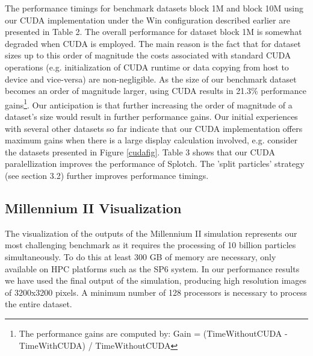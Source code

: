 The performance timings for benchmark datasets block 1M and block 10M using our CUDA 
implementation under the Win configuration described earlier are presented in Table 2. 
The overall performance for dataset block 1M is somewhat degraded when CUDA is employed. 
The main reason is the fact that for dataset sizes up to this order of magnitude the 
costs associated with standard CUDA operations (e.g. initialization of CUDA runtime 
or data copying from host to device and vice-versa) are non-negligible. 
As the size of our benchmark dataset becomes an order of magnitude larger, 
using CUDA results in 21.3\% performance gains\footnote{The performance gains 
are computed by: Gain = (TimeWithoutCUDA - TimeWithCUDA) / TimeWithoutCUDA}. 
Our anticipation is that further increasing the order of magnitude of a dataset's 
size would result in further performance gains. Our initial experiences with several 
other datasets so far indicate that our CUDA implementation offers maximum gains 
when there is a large display calculation involved, e.g. consider the datasets 
presented in Figure \ref{cudafig}. Table 3 shows that our CUDA paralellization improves the 
performance of Splotch. The 'split particles' strategy (see section 3.2) further 
improves performance timings.


\subsection{Millennium II Visualization}
\label{mII}

The visualization of the outputs of the Millennium II simulation \cite{2009MNRAS.398.1150B} 
represents our most challenging benchmark as it requires the processing of 10 billion particles 
simultaneously. To do this at least 300 GB of memory are necessary, only available 
on HPC platforms such as the SP6 system.
In our performance results we have used the final output of the simulation, producing 
high resolution images of 3200x3200 pixels. A minimum number of 128 processors 
is necessary to process the entire dataset.

